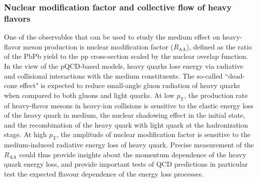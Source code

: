 

\subsubsection{Nuclear modification factor and collective flow of heavy flavors}

One of the observables that can be used to study the medium effect on heavy-flavor meson production is nuclear modification factor ($R_{\mathrm{AA}}$), defined as the ratio of the PbPb yield to the pp cross-section scaled by the nuclear overlap function\cite{glauber}. In the view of the pQCD-based models, heavy quarks lose energy via radiative and collisional interactions with the medium constituents. The so-called ``dead-cone effect" is expected to reduce small-angle gluon radiation of heavy quarks when compared to both gluons and light quarks. At low $p_{\mathrm{T}}$, the production rate of heavy-flavor mesons in heavy-ion collisions is sensitive to the elastic energy loss of the heavy quark in medium, the nuclear shadowing effect in the initial state, and the recombination of the heavy quark with light quark at the hadronization stage. At high $p_{\mathrm{T}}$, the amplitude of nuclear modification factor is sensitive to the medium-induced radiative energy loss of heavy quark. Precise measurement of the $R_{\mathrm{AA}}$ could thus provide insights about the momentum dependence of the heavy quark energy loss, and provide important tests of QCD predictions in particular test the expected flavour dependence of the energy loss processes.

